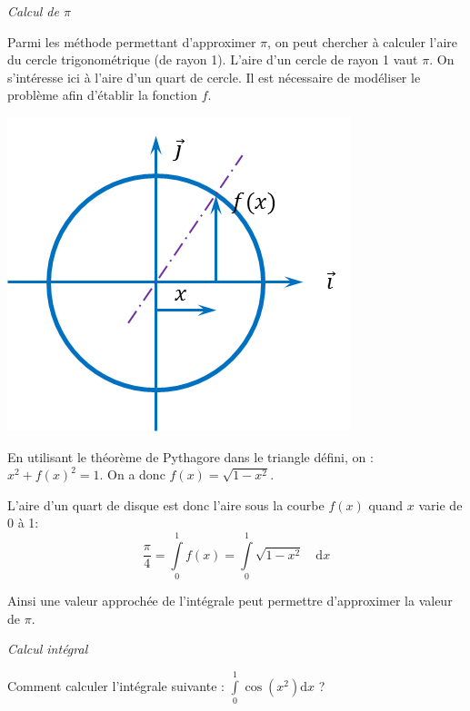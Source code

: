 \documentclass[10pt]{article}
\begin{document}
\begin{exemple}
\textit{Calcul de $\pi$}

\begin{minipage}[c]{.6\linewidth}
Parmi les méthode permettant d'approximer $\pi$, on peut chercher à calculer l'aire du cercle trigonométrique (de rayon 1). L'aire d'un cercle de rayon 1 vaut $\pi$. On s'intéresse ici à l'aire d'un quart de cercle. Il est nécessaire de modéliser le problème afin d'établir la fonction $f$.

\end{minipage}\hfill
\begin{minipage}[c]{.35\linewidth}
\begin{center}
\includegraphics[width=.95\textwidth]{images/cercle}
\end{center}
\end{minipage}

En utilisant le théorème de Pythagore dans le triangle défini, on : $x^2 + f(x)^2 = 1$. On a donc $f(x)=\sqrt{1-x^2}$. 

L'aire d'un quart de disque est donc l'aire sous la courbe $f(x)$ quand $x$ varie de 0 à 1:
$$
\dfrac{\pi}{4}=\int\limits_{0}^1 f(x) =\int\limits_{0}^1\sqrt{1-x^2} \quad \mathrm{d} x
$$

Ainsi une valeur approchée de l'intégrale peut permettre d'approximer la valeur de $\pi$.
\end{exemple}
 
\begin{exemple}
\textit{Calcul intégral}

Comment calculer l'intégrale suivante : $\int\limits_{0}^1 \cos \left(x^2\right) \mathrm{d} x$ ?
\end{exemple}
\end{document}
